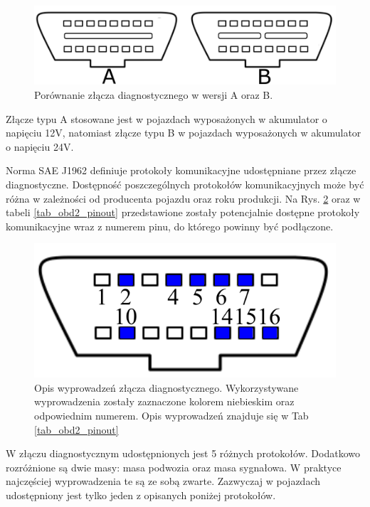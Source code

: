 \documentclass[12pt]{article} %
\numberwithin{equation}{subsection}
\numberwithin{figure}{section}
\numberwithin{table}{section}
\begin{document}
		\begin{figure}[ht]
		\centering
		\includegraphics[scale=0.8]{Images/ZlaczaOBD2.pdf}
		\caption{Porównanie złącza diagnostycznego w wersji A oraz B.}
		\label{rys_obd2_wtyczka}
		\end{figure}
		
		Złącze typu A stosowane jest w pojazdach wyposażonych w akumulator o napięciu 12V, natomiast złącze typu B w pojazdach wyposażonych w akumulator o napięciu 24V.
		
		Norma SAE J1962 definiuje protokoły komunikacyjne udostępniane przez złącze diagnostyczne. Dostępność poszczególnych protokołów komunikacyjnych może być różna w zależności od producenta pojazdu oraz roku produkcji. Na Rys. \ref{rys_obd2_pinout} oraz w tabeli \ref{tab_obd2_pinout} przedstawione zostały potencjalnie dostępne protokoły komunikacyjne wraz z numerem pinu, do którego powinny być podłączone.
		
		\begin{figure}[ht]
		\centering
		\includegraphics[scale=0.8]{Images/ZlaczeOBD2_pinout.pdf}
		\caption{Opis wyprowadzeń złącza diagnostycznego. Wykorzystywane wyprowadzenia zostały zaznaczone kolorem niebieskim oraz odpowiednim numerem. Opis wyprowadzeń znajduje się w Tab \ref{tab_obd2_pinout}}
		\label{rys_obd2_pinout}
		\end{figure}
		
		W złączu diagnostycznym udostępnionych jest 5 różnych protokołów. Dodatkowo rozróżnione są dwie masy: masa podwozia oraz masa sygnałowa. W praktyce najczęściej wyprowadzenia te są ze sobą zwarte. Zazwyczaj w pojazdach udostępniony jest tylko jeden z opisanych poniżej protokołów. 
		
\end{document}
